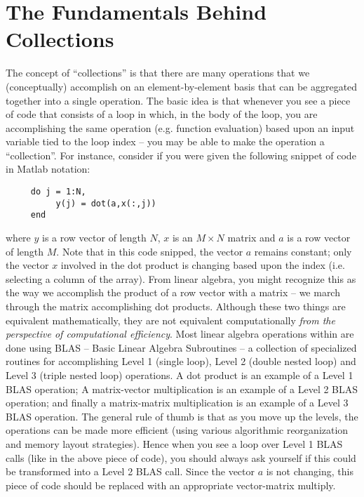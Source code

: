 %
\section{The Fundamentals Behind Collections}

The concept of ``collections'' is that there are many operations that we (conceptually) accomplish on an element-by-element basis that can be aggregated together into a single operation.  The
basic idea is that whenever you see a piece of code that consists of a loop in which, in the body of the loop, you are accomplishing the same operation (e.g. function evaluation) based upon 
an input variable tied to the loop index -- you may be able to make the operation a ``collection''.  For instance, consider if you were given the following snippet of code in Matlab notation:
\vspace{-5mm}
\begin{verbatim}
     do j = 1:N,
          y(j) = dot(a,x(:,j))
     end
\end{verbatim}

\noindent where $y$ is a row vector of length $N$, $x$ is an $M \times N$ matrix and $a$ is a row vector of length $M$.  Note that in this code snipped, the
vector $a$ remains constant; only the vector $x$ involved in the dot product is changing based upon the index (i.e. selecting a column of the array).  
From linear algebra, you might recognize this as the way we accomplish the product of a row vector with a matrix -- we march through the matrix accomplishing
dot products.  Although these two things are equivalent mathematically, they are not equivalent computationally {\em from the perspective of computational efficiency}.   Most linear algebra operations within {\nek} are done using BLAS -- Basic Linear Algebra Subroutines -- a collection of specialized routines
for accomplishing Level 1 (single loop), Level 2 (double nested loop) and Level 3 (triple nested loop) operations.  A dot product is an example of a Level 1
BLAS operation;  A matrix-vector multiplication is an example of a Level 2 BLAS operation; and finally a matrix-matrix multiplication is an example of a Level 3
BLAS operation.  The general rule of thumb is that as you move up the levels, the operations can be made more efficient (using various algorithmic 
reorganization and memory layout strategies).  Hence when you see a loop over Level 1 BLAS calls (like in the above piece of code), you should always
ask yourself if this could be transformed into a Level 2 BLAS call.  Since the vector $a$ is not changing, this piece of code should be replaced with an
appropriate vector-matrix multiply.

